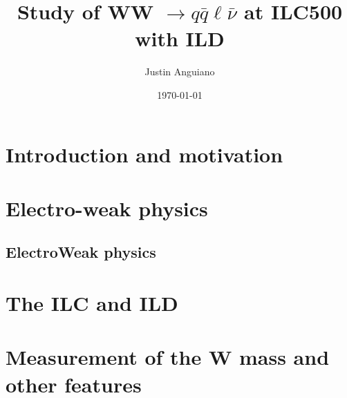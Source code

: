 \documentclass[%
 amsmath,amssymb,
 aps,
 prc
]{revtex4-1}
\begin{document}
\title{Study of WW $\rightarrow q\bar{q}\ell\bar{\nu}$ at ILC500 with ILD }
\author{Justin Anguiano}
\date{\today}


\begin{abstract}

\end{abstract}


\maketitle


\section{Introduction and motivation}
\label{sec:Introduction}
%

\section{Electro-weak physics}
\label{sec:ElectroWeak_physics}
\subsection{ElectroWeak physics}
\label{subsec:ElectorWeak_physics}





\section{The ILC and ILD}
\label{sec:CMS_detector}
%


\section{Measurement of the W mass and other features}
\label{Current_Work} 

\end{document}
